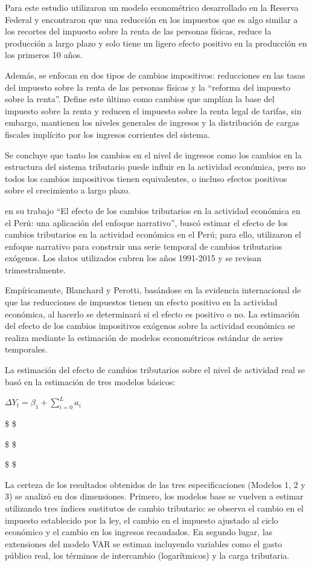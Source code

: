 \documentclass[
  letterpaper,
]{article}
\begin{document}
Para este estudio utilizaron un modelo econométrico desarrollado en la
Reserva Federal y encontraron que una reducción en los impuestos que es
algo similar a los recortes del impuesto sobre la renta de las personas
físicas, reduce la producción a largo plazo y solo tiene un ligero
efecto positivo en la producción en los primeros 10 años.

Además, se enfocan en dos tipos de cambios impositivos: reducciones en
las tasas del impuesto sobre la renta de las personas físicas y la
``reforma del impuesto sobre la renta''. Define este último como cambios
que amplían la base del impuesto sobre la renta y reducen el impuesto
sobre la renta legal de tarifas, sin embargo, mantienen los niveles
generales de ingresos y la distribución de cargas fiscales implícito por
los ingresos corrientes del sistema.

Se concluye que tanto los cambios en el nivel de ingresos como los
cambios en la estructura del sistema tributario puede influir en la
actividad económica, pero no todos los cambios impositivos tienen
equivalentes, o incluso efectos positivos sobre el crecimiento a largo
plazo.

\textcite{lahura_efecto_2018} en su trabajo ``El efecto de los cambios
tributarios en la actividad económica en el Perú: una aplicación del
enfoque narrativo'', buscó estimar el efecto de los cambios tributarios
en la actividad económica en el Perú; para ello, utilizaron el enfoque
narrativo para construir una serie temporal de cambios tributarios
exógenos. Los datos utilizados cubren los años 1991-2015 y se revisan
trimestralmente.

Empíricamente, Blanchard y Perotti, basándose en la evidencia
internacional de que las reducciones de impuestos tienen un efecto
positivo en la actividad económica, al hacerlo se determinará si el
efecto es positivo o no. La estimación del efecto de los cambios
impositivos exógenos sobre la actividad económica se realiza mediante la
estimación de modelos econométricos estándar de series temporales.

La estimación del efecto de cambios tributarios sobre el nivel de
actividad real se basó en la estimación de tres modelos básicos:

\(\Delta Y_t = \beta_{1} + \sum_{i=0}^{L} a_i\)

\$ \$

\$ \$

\$ \$

La certeza de los resultados obtenidos de las tres especificaciones
(Modelos 1, 2 y 3) se analizó en dos dimensiones. Primero, los modelos
base se vuelven a estimar utilizando tres índices sustitutos de cambio
tributario: se observa el cambio en el impuesto establecido por la ley,
el cambio en el impuesto ajustado al ciclo económico y el cambio en los
ingresos recaudados. En segundo lugar, las extensiones del modelo VAR se
estiman incluyendo variables como el gasto público real, los términos de
intercambio (logarítmicos) y la carga tributaria.
\end{document}
